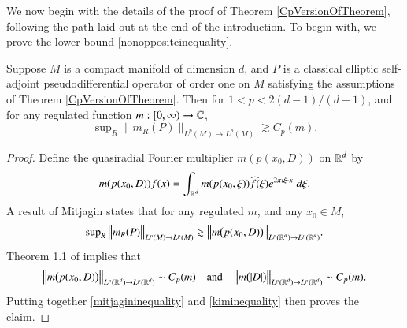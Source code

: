 We now begin with the details of the proof of Theorem \ref{CpVersionOfTheorem}, following the path laid out at the end of the introduction. To begin with, we prove the lower bound \eqref{nonoppositeinequality}.

\begin{lemma} \label{lowerboundlemma}
    Suppose $M$ is a compact manifold of dimension $d$, and $P$ is a classical elliptic self-adjoint pseudodifferential operator of order one on $M$ satisfying the assumptions of Theorem \ref{CpVersionOfTheorem}. Then for $1 < p < 2(d-1)/(d+1)$, and for any regulated function $m: [0,\infty) \to \operatorname{\mathbb{C}}$,
    \begin{equation}
        \sup\nolimits_R \| m_R(P) \|_{L^p(M) \to L^p(M)} \gtrsim C_p(m).
    \end{equation}
\end{lemma}
\begin{proof}
Define the quasiradial Fourier multiplier $m( p(x_0,D) )$ on $\operatorname{\mathbb{R}}^d$ by
%
\begin{equation}
    m( p(x_0,D) ) f(x) = \int_{\operatorname{\mathbb{R}}^d} m(p(x_0,\xi)) \widehat{f}(\xi) e^{2 \pi i \xi \cdot x}\; d\xi.
\end{equation}
%
A result of Mitjagin \cite{Mitjagin} %
states that for any regulated $m$, and any $x_0 \in M$,
%
\begin{equation}
\label{mitjagininequality}
    \sup\nolimits_R \big\| m_R(P) \big\|_{L^p(M) \to L^p(M)} \gtrsim \big\| m \big( p(x_0,D) \big) \big\|_{L^p(\operatorname{\mathbb{R}}^d) \to L^p(\operatorname{\mathbb{R}}^d)}.
\end{equation}
%
Theorem 1.1 of \cite{KimQuasiradial} implies that
%
\begin{equation} \label{kiminequality}
    \big\| m \big( p(x_0,D) \big) \big\|_{L^p(\operatorname{\mathbb{R}}^d) \to L^p(\operatorname{\mathbb{R}}^d)} \sim C_p(m) \quad\text{and}\quad \big\| m\big( |D| \big) \big\|_{L^p(\operatorname{\mathbb{R}}^d) \to L^p(\operatorname{\mathbb{R}}^d)} \sim C_p(m).
\end{equation}
%
Putting together \eqref{mitjagininequality} and \eqref{kiminequality} then proves the claim. %
\end{proof}

